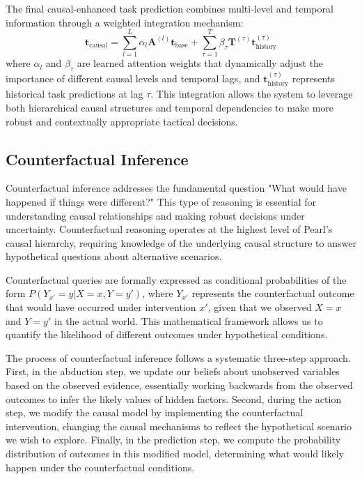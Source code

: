 \documentclass[12pt]{article}
\begin{document}
The final causal-enhanced task prediction combines multi-level and temporal information through a weighted integration mechanism:
\begin{equation}
\mathbf{t}_{\text{causal}} = \sum_{l=1}^{L} \alpha_l \mathbf{A}^{(l)} \mathbf{t}_{\text{base}} + \sum_{\tau=1}^{T} \beta_\tau \mathbf{T}^{(\tau)} \mathbf{t}_{\text{history}}^{(\tau)}
\end{equation}
where $\alpha_l$ and $\beta_\tau$ are learned attention weights that dynamically adjust the importance of different causal levels and temporal lags, and $\mathbf{t}_{\text{history}}^{(\tau)}$ represents historical task predictions at lag $\tau$. This integration allows the system to leverage both hierarchical causal structures and temporal dependencies to make more robust and contextually appropriate tactical decisions.

\subsection{Counterfactual Inference}

Counterfactual inference addresses the fundamental question "What would have happened if things were different?" This type of reasoning is essential for understanding causal relationships and making robust decisions under uncertainty. Counterfactual reasoning operates at the highest level of Pearl's causal hierarchy, requiring knowledge of the underlying causal structure to answer hypothetical questions about alternative scenarios.

Counterfactual queries are formally expressed as conditional probabilities of the form $P(Y_{x'} = y | X = x, Y = y')$, where $Y_{x'}$ represents the counterfactual outcome that would have occurred under intervention $x'$, given that we observed $X = x$ and $Y = y'$ in the actual world. This mathematical framework allows us to quantify the likelihood of different outcomes under hypothetical conditions.

The process of counterfactual inference follows a systematic three-step approach. First, in the abduction step, we update our beliefs about unobserved variables based on the observed evidence, essentially working backwards from the observed outcomes to infer the likely values of hidden factors. Second, during the action step, we modify the causal model by implementing the counterfactual intervention, changing the causal mechanisms to reflect the hypothetical scenario we wish to explore. Finally, in the prediction step, we compute the probability distribution of outcomes in this modified model, determining what would likely happen under the counterfactual conditions.
\end{document}
